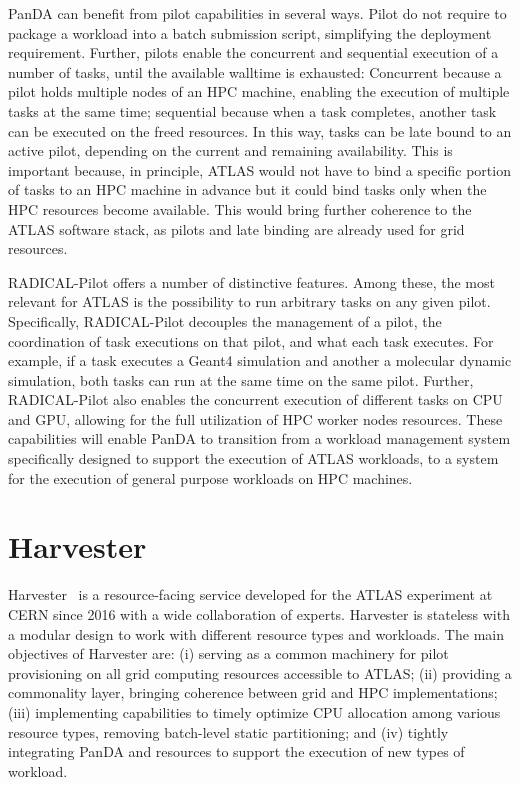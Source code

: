 \documentclass{webofc}
\begin{document}
PanDA can benefit from pilot capabilities in several ways. Pilot do not
require to package a workload into a batch submission script, simplifying the
deployment requirement. Further, pilots enable the concurrent and sequential
execution of a number of tasks, until the available walltime is exhausted:
Concurrent because a pilot holds multiple nodes of an HPC machine, enabling
the execution of multiple tasks at the same time; sequential because when a
task completes, another task can be executed on the freed resources. In this
way, tasks can be late bound to an active pilot, depending on the current and
remaining availability. This is important because, in principle, ATLAS would
not have to bind a specific portion of tasks to an HPC machine in advance but
it could bind tasks only when the HPC resources become available. This would
bring further coherence to the ATLAS software stack, as pilots and late binding
are already used for grid resources.

RADICAL-Pilot offers a number of distinctive features. Among these, the most
relevant for ATLAS is the possibility to run arbitrary tasks on any given
pilot. Specifically, RADICAL-Pilot decouples the management of a pilot, the
coordination of task executions on that pilot, and what each task executes.
For example, if a task executes a Geant4 simulation and another a molecular
dynamic simulation, both tasks can run at the same time on the same pilot.
Further, RADICAL-Pilot also enables the concurrent execution of different
tasks on CPU and GPU, allowing for the full utilization of HPC worker nodes
resources. These capabilities will enable PanDA to transition from a workload
management system specifically designed to support the execution of ATLAS
workloads, to a system for the execution of general purpose workloads on HPC
machines.


\section{Harvester}
\label{section:harvester}

Harvester~\cite{Megino_2017} is a resource-facing service developed for the
ATLAS experiment at CERN since 2016 with a wide collaboration of experts.
Harvester is stateless with a modular design to work with different resource
types and workloads. The main objectives of Harvester are: (i) serving as a
common machinery for pilot provisioning on all grid computing resources
accessible to ATLAS; (ii) providing a commonality layer, bringing coherence
between grid and HPC implementations; (iii) implementing capabilities to
timely optimize CPU allocation among various resource types, removing
batch-level static partitioning; and (iv) tightly integrating PanDA and
resources to support the execution of new types of workload.
\end{document}
